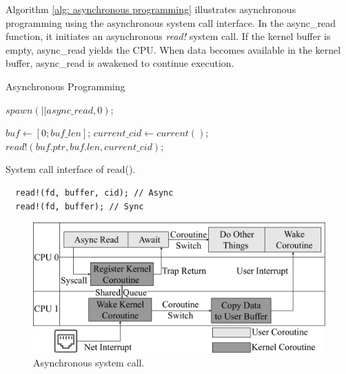 \documentclass[conference]{IEEEtran}
\begin{document}
Algorithm \ref{alg: asynchronous programming} illustrates asynchronous programming using the asynchronous system call interface. In the async\_read function, it initiates an asynchronous \textit{read!} system call. If the kernel buffer is empty, async\_read yields the CPU. When data becomes available in the kernel buffer, async\_read is awakened to continue execution.

\begin{algorithm}[!ht]
  \caption{Asynchronous Programming}
  \label{alg: asynchronous programming}
  \begin{algorithmic}[1]
      \State $spawn(|| async\_read, 0)$;
		\EndFunction

      \State $buf \gets [0; buf\_len]$;
      \State $current\_cid \gets current()$;
      \State $read!(buf.ptr, buf.len, current\_cid)$;
    \EndFunction
  \end{algorithmic}
\end{algorithm}

\begin{listing}
  \caption{System call interface of read().}
  \label{listing: system call}
  \begin{mdframed}
  \begin{verbatim}
  read!(fd, buffer, cid); // Async
  read!(fd, buffer); // Sync
  \end{verbatim}
  \end{mdframed}
\end{listing}

\begin{figure}[tbp]
  \centering
  \includegraphics[width=\linewidth]{assets/async_syscall.pdf}
  \caption{Asynchronous system call.}
  \label{fig:async_syscall}
  \vspace{-1em}
\end{figure}
\end{document}
